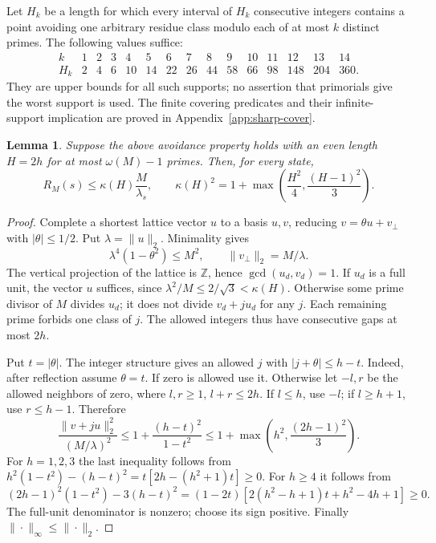 \documentclass[11pt]{article}
\newtheorem{lemma}[theorem]{Lemma}
\theoremstyle{definition}\newtheorem{definition}[theorem]{Definition}
\theoremstyle{remark}\newtheorem{remark}[theorem]{Remark}
\newcommand{\Z}{\mathbb Z}
\begin{document}
Let \(H_k\) be a length for which every interval of \(H_k\) consecutive
integers contains a point avoiding one arbitrary residue class modulo each
of at most \(k\) distinct primes. The following values suffice:
\[
\begin{array}{c|rrrrrrrrrrrrrr}
 k&1&2&3&4&5&6&7&8&9&10&11&12&13&14\\ \hline
 H_k&2&4&6&10&14&22&26&44&58&66&98&148&204&360 .
\end{array}                                                        \tag{S2}\label{eq:sharp-cover}
\]
They are upper bounds for all such supports; no assertion that primorials
give the worst support is used. The finite covering predicates and their
infinite-support implication are proved in Appendix~\ref{app:sharp-cover}.

\begin{lemma}\label{lem:sharp-shear}
Suppose the above avoidance property holds with an even length \(H=2h\)
for at most \(\omega(M)-1\) primes. Then, for every state,
\[
 R_M(s)\le\kappa(H)\frac M{\lambda_s},\qquad
 \kappa(H)^2=1+\max\left(\frac{H^2}{4},\frac{(H-1)^2}{3}\right).
                                                                    \tag{S3}\label{eq:sharp-shear}
\]
\end{lemma}
\begin{proof}
Complete a shortest lattice vector \(u\) to a basis \(u,v\), reducing
\(v=\theta u+v_\perp\) with \(|\theta|\le1/2\).
Put \(\lambda=\|u\|_2\). Minimality gives
\[
 \lambda^4(1-\theta^2)\le M^2,\qquad \|v_\perp\|_2=M/\lambda.
\]
The vertical projection of the lattice is \(\Z\), hence
\(\gcd(u_d,v_d)=1\). If \(u_d\) is a full unit, the vector \(u\)
suffices, since \(\lambda^2/M\le2/\sqrt3<\kappa(H)\).
Otherwise some prime divisor of \(M\) divides \(u_d\); it does not divide
\(v_d+ju_d\) for any \(j\). Each remaining prime forbids one class of \(j\).
The allowed integers thus have consecutive gaps at most \(2h\).

Put \(t=|\theta|\). The integer structure gives an allowed \(j\) with
\(|j+\theta|\le h-t\). Indeed, after reflection assume \(\theta=t\).
If zero is allowed use it. Otherwise let \(-l,r\) be the allowed
neighbors of zero, where \(l,r\ge1\), \(l+r\le2h\).
If \(l\le h\), use \(-l\); if \(l\ge h+1\), use \(r\le h-1\).
Therefore
\[
 \frac{\|v+ju\|_2^2}{(M/\lambda)^2}
 \le 1+\frac{(h-t)^2}{1-t^2}
 \le1+\max\left(h^2,\frac{(2h-1)^2}{3}\right).
\]
For \(h=1,2,3\) the last inequality follows from
\(h^2(1-t^2)-(h-t)^2=t[2h-(h^2+1)t]\ge0\).
For \(h\ge4\) it follows from
\[
 (2h-1)^2(1-t^2)-3(h-t)^2
 =(1-2t)[2(h^2-h+1)t+h^2-4h+1]\ge0.
\]
The full-unit denominator is nonzero; choose its sign positive.
Finally \(\|\cdot\|_\infty\le\|\cdot\|_2\).
\end{proof}
\end{document}
